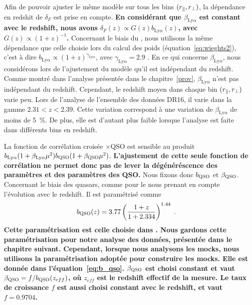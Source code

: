 \documentclass[11pt, twoside, a4paper, openright]{report}
\begin{document}
Afin de pouvoir ajuster le même modèle sur tous les bins $(r_{\parallel}{}, r_{\perp})$, la dépendance en redshit de $\delta_F$ est prise en compte.
\textbf{En considérant que $\beta_{\mathrm{Ly}\alpha}$ est constant avec le redshift, nous avons $\delta_F(z) \propto G(z) b_{\mathrm{Ly}\alpha}(z)$, avec $G(z) \propto (1+z)^{-1}$.}
Concernant le biais du \lya{}, nous utilisons la même dépendance que celle choisie lors du calcul des poids (équation~\ref{eq:wieghts2}), c'est à dire $b_{\mathrm{Ly}\alpha} \propto (1+z)^{\gamma_{\mathrm{Ly}\alpha}}$, avec $\gamma_{\mathrm{Ly}\alpha} = 2.9$ \autocite{McDonald2004}.
En ce qui concerne $\beta_{\mathrm{Ly}\alpha}$, nous considérons lors de l'ajustement du modèle qu'il est indépendant du redshift. Comme montré dans l'analyse présentée dans le chapitre~\ref{prov}, $\beta_{\mathrm{Ly}\alpha}$ n'est pas indépendant du redshift. Cependant, le redshift moyen dans chaque bin $(r_{\parallel}{}, r_{\perp})$ varie peu. Lors de l'analyse de l'ensemble des données DR16, il varie dans la gamme $\num{2.31} < z < \num{2.39}$. Cette variation correspond à une variation de $\beta_{\mathrm{Ly}\alpha}$ de moins de \SI{5}{\percent}. De plus, elle est d'autant plus faible lorsque l'analyse est faite dans différents bins en redshift.

La fonction de corrélation croisée \lya{}$\times$QSO est sensible au produit $b_{\mathrm{Ly}\alpha}(1+\beta_{\mathrm{Ly}\alpha} \mu^2) b_{\textsc{QSO}}(1+\beta_{\textsc{QSO}} \mu^2)$.
\textbf{L'ajustement de cette seule fonction de corrélation ne permet donc pas de lever la dégénéréscence des paramètres \lya{} et des paramètres des QSO.}
Nous fixons donc $b_{\textsc{QSO}}$ et $\beta_{\textsc{QSO}}$. Concernant le biais des quasars, comme pour le \lya{} nous prenant en compte l'évolution avec le redshift. Il est paramétrisé comme
\begin{equation}
  b_{\textsc{QSO}}(z) = \num{3.77} \left( \frac{1 + z}{1+\num{2.334}} \right)^{\num{1.44}} \; . 
\end{equation}
\textbf{Cette paramétrisation est celle choisie dans \textcite{prov}. Nous gardons cette paramétrisation pour notre analyse des données, présentée dans le chapitre suivant. Cependant, lorsque nous analysons les mocks, nous utilisons la paramétrisation adoptée pour construire les mocks. Elle est donnée dans l'équation~\ref{eq:b_qso}.
$\beta_{\textsc{QSO}}$ est choisi constant et vaut $\beta_{\textsc{QSO}} = f / b_{\textsc{QSO}}(z_{eff})$, où $z_{eff}$ est le redshift effectif de la mesure. Le taux de croissance $f$ est aussi choisi constant avec le redshift, et vaut $f = \num{0.9704}$.}
\end{document}
